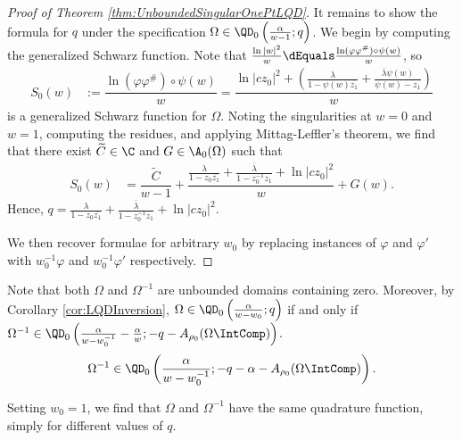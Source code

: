 \documentclass{article}
\numberwithin{equation}{section}
\begin{document}
\begin{proof}[Proof of Theorem \ref{thm:UnboundedSingularOnePtLQD}]
It remains to show the formula for $q$ under the specification $\Omega\in\QD_0\left(\frac{\alpha}{w-1};q\right)$. We begin by computing the generalized Schwarz function. Note that $\frac{\ln|w|^2}{w}\dEquals \frac{\ln(\varphi\varphi^{\#})\circ\psi(w)}{w}$, so
\begin{align*}
    S_0(w)&:=\dfrac{\ln(\varphi\varphi^{\#})\circ\psi(w)}{w}=\dfrac{\ln|cz_0|^2+\left(\frac{\lambda}{1-\psi(w)\overline{z_1}}+\frac{\overline{\lambda}\psi(w)}{\psi(w)-z_1}\right)}{w}
\end{align*}
is a generalized Schwarz function for $\Omega$. Noting the singularities at $w=0$ and $w=1$, computing the residues, and applying Mittag-Leffler's theorem, we find that there exist $\widetilde{C}\in\C$ and $G\in\A_0(\Omega)$ such that
\begin{align*}
    S_0(w)&=\dfrac{\widetilde{C}}{w-1}+\dfrac{\frac{\lambda}{1-z_0\overline{z_1}}+\frac{\overline{\lambda}}{1-z_0^{-1}z_1}+\ln|cz_0|^2}{w}+G(w).
\end{align*}
Hence, $q=\frac{\lambda}{1-z_0\overline{z_1}}+\frac{\overline{\lambda}}{1-z_0^{-1}z_1}+\ln|cz_0|^2$.

We then recover formulae for arbitrary $w_0$ by replacing instances of $\varphi$ and $\varphi'$ with $w_0^{-1}\varphi$ and $w_0^{-1}\varphi'$ respectively.
\end{proof}

Note that both $\Omega$ and $\Omega^{-1}$ are unbounded domains containing zero. Moreover, by Corollary \ref{cor:LQDInversion}, $\Omega\in\QD_0\left(\frac{\alpha}{w-w_0};q\right)$ if and only if $\Omega^{-1}\in\QD_0\left(\frac{\alpha}{w-w_0^{-1}}-\frac{\alpha}{w};-q-A_{\rho_0}(\Omega\IntComp)\right)$.
$$\Omega^{-1}\in\QD_0\left(\frac{\alpha}{w-w_0^{-1}};-q-\alpha-A_{\rho_0}(\Omega\IntComp)\right).$$

Setting $w_0=1$, we find that $\Omega$ and $\Omega^{-1}$ have the same quadrature function, simply for different values of $q$.
\end{document}
